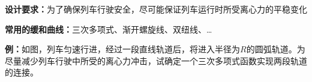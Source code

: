 \begin{center}
\end{center}

{\bf 设计要求：}为了确保列车行驶安全，尽可能保证列车运行时所受离心力的平稳变化

{\bf 常用的缓和曲线：}三次多项式、渐开螺旋线、双纽线、\ldots

{\bf 例：}如图，列车匀速行进，经过一段直线轨道后，将进入半径为$R$的圆弧轨道。为
尽量减少列车行驶中所受的离心力冲击，试确定一个三次多项式函数实现两段轨道的连接。

\begin{center}
\end{center}


